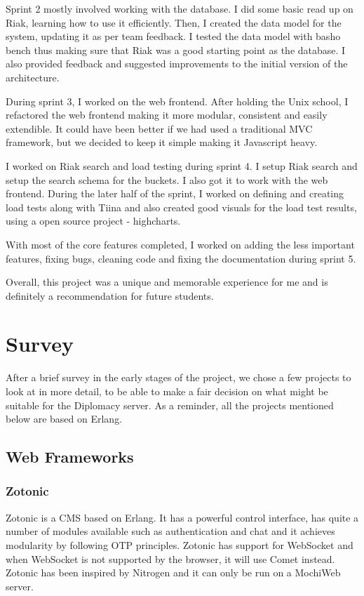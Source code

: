 \documentclass[11pt,a4paper]{report}
\begin{document}
Sprint 2 mostly involved working with the database. I did some basic read up on
Riak, learning how to use it efficiently. Then, I created the data model for the
system, updating it as per team feedback. I tested the data model with basho
bench thus making sure that Riak was a good starting point as the database. I
also provided feedback and suggested improvements to the initial version of the
architecture.

During sprint 3, I worked on the web frontend. After holding the Unix school, I
refactored the web frontend making it more modular, consistent and easily
extendible. It could have been better if we had used a traditional MVC
framework, but we decided to keep it simple making it Javascript heavy.

I worked on Riak search and load testing during sprint 4. I setup Riak search
and setup the search schema for the buckets. I also got it to work with the web
frontend. During the later half of the sprint, I worked on defining and creating
load tests along with Tiina and also created good visuals for the load test
results, using a open source project - highcharts.

With most of the core features completed, I worked on adding the less important
features, fixing bugs, cleaning code and fixing the documentation during sprint
5.

Overall, this project was a unique and memorable experience for me and is
definitely a recommendation for future students.
\chapter{Survey}
After a brief survey in the early stages of the project, we chose a few projects
to look at in more detail, to be able to make a fair decision on what might be
suitable for the Diplomacy server. As a reminder, all the projects mentioned
below are based on Erlang.

\section{Web Frameworks}
\subsection{Zotonic}
Zotonic\cite{zotonic} is a CMS based on Erlang. It has a powerful control
interface, has quite a number of modules available such as authentication and
chat and it achieves modularity by following OTP principles. Zotonic has support
for WebSocket and when WebSocket is not supported by the browser, it will
use Comet instead. Zotonic has been inspired by Nitrogen and it can only be run
on a MochiWeb server.
\end{document}

